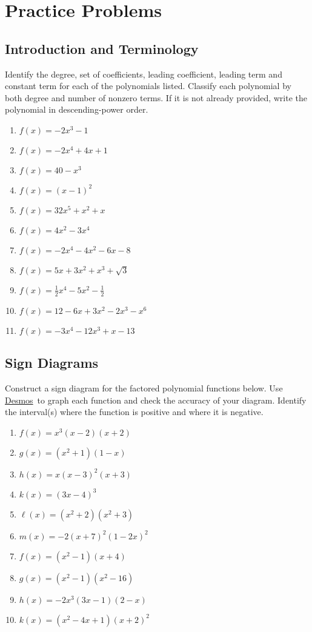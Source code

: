 \documentclass[12pt]{book}
\theoremstyle{definition}
\newcommand{\Desmos}{\href{https://www.desmos.com/}{Desmos}}
\begin{document}
\section{Practice Problems}
\subsection*{Introduction and Terminology}
Identify the degree, set of coefficients, leading coefficient, leading term and constant term for each of the polynomials listed.  Classify each polynomial by both degree and number of nonzero terms.  If it is not already provided, write the polynomial in descending-power order.
\begin{multicols}{2}
\begin{enumerate}
\item $f(x)=-2x^3-1$
\item $f(x)=-2x^4 + 4x+1$
\item $f(x)=40-x^3$
\item $f(x)=(x-1)^2$
\item $f(x)=32x^5+x^2+x$
\item $f(x)=4x^2-3x^4$
\item $f(x)=-2x^4-4x^2-6x-8$
\item $f(x)=5x+3x^2+x^3+\sqrt{3}$
\item $f(x)=\frac{1}{2}x^4-5x^2-\frac{1}{2}$
\item $f(x)=12-6x+3x^2-2x^3-x^6$
\item $f(x)=-3x^4-12x^3+x-13$
\end{enumerate}
\end{multicols}
\subsection*{Sign Diagrams}
Construct a sign diagram for the factored polynomial functions below. Use \Desmos \ to graph each function and check the accuracy of your diagram.  Identify the interval(s) where the function is positive and where it is negative.
\begin{multicols}{2}
\begin{enumerate}
\item $f(x)=x^3(x-2)(x+2)$
\item $g(x)=(x^2+1)(1-x)$
\item $h(x)=x(x-3)^2(x+3)$
\item $k(x)=(3x-4)^3$
\item $\ell(x)=(x^2+2)(x^2+3)$
\item $m(x)=-2(x+7)^2(1-2x)^2$
\item $f(x)=(x^2-1)(x+4)$
\item $g(x)=(x^2-1)(x^2-16)$
\item $h(x)=-2x^3(3x-1)(2-x)$
\item $k(x)=(x^2-4x+1)(x+2)^2$
\end{enumerate}
\end{multicols}
\end{document}
